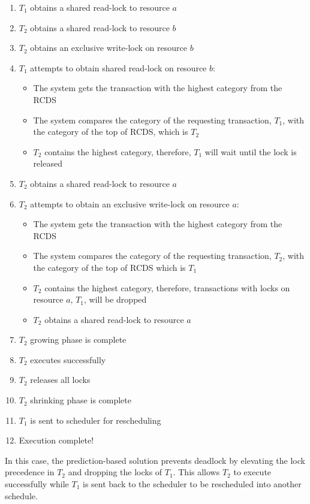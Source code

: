 \begin{enumerate}
  \item $T_{1}$ obtains a shared read-lock to resource $a$
  \item $T_{2}$ obtains a shared read-lock to resource $b$
  \item $T_{2}$ obtains an exclusive write-lock on resource $b$
  \item $T_{1}$ attempts to obtain shared read-lock on resource $b$:
    \begin{itemize}
        \item The system gets the transaction with the highest category from the RCDS
        \item The system compares the category of the requesting transaction, $T_{1}$, with the category of the top of RCDS, which is $T_{2}$
        \item $T_{2}$ contains the highest category, therefore, $T_{1}$ will wait until the lock is released
    \end{itemize}
  \item $T_{2}$ obtains a shared read-lock to resource $a$
  \item $T_{2}$ attempts to obtain an exclusive write-lock on resource $a$:
    \begin{itemize}
        \item The system gets the transaction with the highest category from the RCDS
        \item The system compares the category of the requesting transaction, $T_{2}$, with the category of the top of RCDS which is $T_{1}$
        \item $T_{2}$ contains the highest category, therefore, transactions with locks on resource $a$, $T_{1}$, will be dropped
        \item $T_{2}$ obtains a shared read-lock to resource $a$
    \end{itemize}    
  \item $T_{2}$ growing phase is complete
  \item $T_{2}$ executes successfully
  \item $T_{2}$ releases all locks
  \item $T_{2}$ shrinking phase is complete
  \item $T_{1}$ is sent to scheduler for rescheduling
  \item Execution complete!
\end{enumerate}

In this case, the prediction-based solution prevents deadlock by elevating the lock precedence in $T_{2}$ and dropping the locks of $T_{1}$. This allows $T_{2}$ to execute successfully while $T_{1}$ is sent back to the scheduler to be rescheduled into another schedule.

